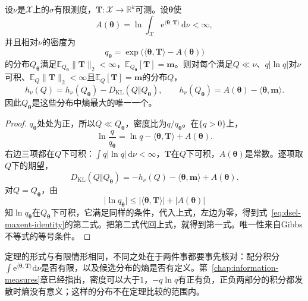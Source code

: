 \begin{theorem}[相对参考测度的最大熵]
\label{thm:dsel-maxent-continuous}
设$\nu$是$\mathcal{X}$上的$\sigma$有限测度，$\bm{T}:\mathcal{X}\to\mathbb{R}^{k}$可测。设$\bm{\theta}$使
\begin{equation}
 A(\bm{\theta})=\ln\int_{\mathcal{X}}\mathrm{e}^{\langle\bm{\theta},\bm{T}\rangle}\,\mathrm{d}\nu<\infty ,
 \label{eq:dsel-maxent-partition}
\end{equation}
并且相对$\nu$的密度为
\begin{equation}
 q_{\bm{\theta}}=\exp\bigl(\langle\bm{\theta},\bm{T}\rangle-A(\bm{\theta})\bigr)
 \label{eq:dsel-maxent-density}
\end{equation}
的分布$Q_{\bm{\theta}}$满足$\mathbb{E}_{Q_{\bm{\theta}}}\lVert\bm{T}\rVert_2<\infty$，$\mathbb{E}_{Q_{\bm{\theta}}}[\bm{T}]=\bm{m}$。则对每个满足$Q\ll\nu$、$q\lvert\ln q\rvert$对$\nu$可积、$\mathbb{E}_{Q}\lVert\bm{T}\rVert_2<\infty$且$\mathbb{E}_{Q}[\bm{T}]=\bm{m}$的分布$Q$，
\begin{equation}
 h_\nu(Q)=h_\nu(Q_{\bm{\theta}})-D_{\mathrm{KL}}(Q\Vert Q_{\bm{\theta}}),\qquad h_\nu(Q_{\bm{\theta}})=A(\bm{\theta})-\langle\bm{\theta},\bm{m}\rangle .
 \label{eq:dsel-maxent-identity}
\end{equation}
因此$Q_{\bm{\theta}}$是这些分布中熵最大的唯一一个。
\end{theorem}

\begin{proof}
$q_{\bm{\theta}}$处处为正，所以$Q\ll Q_{\bm{\theta}}$，密度比为$q/q_{\bm{\theta}}$。在$\{q>0\}$上，
\[
 \ln\frac{q}{q_{\bm{\theta}}}=\ln q-\langle\bm{\theta},\bm{T}\rangle+A(\bm{\theta}) .
\]
右边三项都在$Q$下可积：$\int q\lvert\ln q\rvert\,\mathrm{d}\nu<\infty$，$\bm{T}$在$Q$下可积，$A(\bm{\theta})$是常数。逐项取$Q$下的期望，
\[
 D_{\mathrm{KL}}(Q\Vert Q_{\bm{\theta}})=-h_\nu(Q)-\langle\bm{\theta},\bm{m}\rangle+A(\bm{\theta}) .
\]
对$Q=Q_{\bm{\theta}}$，由
\[
 \lvert\ln q_{\bm{\theta}}\rvert\leq\lvert\langle\bm{\theta},\bm{T}\rangle\rvert+\lvert A(\bm{\theta})\rvert
\]
知$\ln q_{\bm{\theta}}$在$Q_{\bm{\theta}}$下可积，它满足同样的条件，代入上式，左边为零，得到式~\eqref{eq:dsel-maxent-identity}的第二式。把第二式代回上式，就得到第一式。唯一性来自Gibbs不等式的等号条件。
\end{proof}

定理的形式与有限情形相同，不同之处在于两件事都要事先核对：配分积分$\int\mathrm{e}^{\langle\bm{\theta},\bm{T}\rangle}\mathrm{d}\nu$是否有限，以及候选分布的熵是否有定义。第~\ref{chap:information-measures}章已经指出，密度可以大于$1$，$-q\ln q$有正有负，正负两部分的积分都发散时熵没有意义；这样的分布不在定理比较的范围内。

